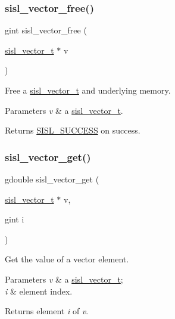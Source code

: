 \subsubsection{\texorpdfstring{sisl\+\_\+vector\+\_\+free()}{sisl\_vector\_free()}}
{\footnotesize\ttfamily gint sisl\+\_\+vector\+\_\+free (\begin{DoxyParamCaption}\item[{\mbox{\hyperlink{group__vector_gacbac585492f5005f05f0c0b8463039be}{sisl\+\_\+vector\+\_\+t}} $\ast$}]{v }\end{DoxyParamCaption})}

Free a \mbox{\hyperlink{group__vector_gacbac585492f5005f05f0c0b8463039be}{sisl\+\_\+vector\+\_\+t}} and underlying memory.


\begin{DoxyParams}{Parameters}
{\em v} & a \mbox{\hyperlink{group__vector_gacbac585492f5005f05f0c0b8463039be}{sisl\+\_\+vector\+\_\+t}}.\\
\hline
\end{DoxyParams}
\begin{DoxyReturn}{Returns}
\mbox{\hyperlink{group__status_gga82c112a16803c9ddebc065a1b0f16287a60b9f04752a2c4dd6214f8a4fd7d913b}{S\+I\+S\+L\+\_\+\+S\+U\+C\+C\+E\+SS}} on success. 
\end{DoxyReturn}
\mbox{\label{group__vector_ga461356df443bbecc3a89173878311f31}} 
\subsubsection{\texorpdfstring{sisl\+\_\+vector\+\_\+get()}{sisl\_vector\_get()}}
{\footnotesize\ttfamily gdouble sisl\+\_\+vector\+\_\+get (\begin{DoxyParamCaption}\item[{\mbox{\hyperlink{group__vector_gacbac585492f5005f05f0c0b8463039be}{sisl\+\_\+vector\+\_\+t}} $\ast$}]{v,  }\item[{gint}]{i }\end{DoxyParamCaption})}

Get the value of a vector element.


\begin{DoxyParams}{Parameters}
{\em v} & a \mbox{\hyperlink{group__vector_gacbac585492f5005f05f0c0b8463039be}{sisl\+\_\+vector\+\_\+t}}; \\
\hline
{\em i} & element index.\\
\hline
\end{DoxyParams}
\begin{DoxyReturn}{Returns}
element {\itshape i} of {\itshape v}. 
\end{DoxyReturn}
\mbox{\label{group__vector_ga9567ba6afca899f94089827012a933bc}} 

